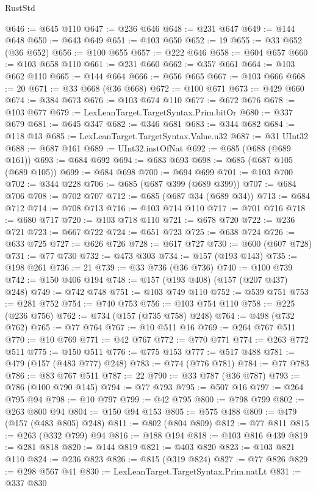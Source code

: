\begin{lexlean}{RustStd}
\begin{coremodule}
@646 := @645 @110
@647 := @236 @646
@648 := @231 @647
@649 := @144 @648
@650 := @643 @649
@651 := @103 @650
@652 := 19
@655 := @33 @652 (@36 @652)
@656 := @100 @655
@657 := @222 @646
@658 := @604 @657
@660 := @103 @658 @110
@661 := @231 @660
@662 := @357 @661
@664 := @103 @662 @110
@665 := @144 @664
@666 := @656 @665
@667 := @103 @666
@668 := 20
@671 := @33 @668 (@36 @668)
@672 := @100 @671
@673 := @429 @660
@674 := @384 @673
@676 := @103 @674 @110
@677 := @672 @676
@678 := @103 @677
@679 := LexLeanTarget.TargetSyntax.Prim.bitOr
@680 := @337 @679
@681 := @645 @347
@682 := @346 @681
@683 := @344 @682
@684 := @118 @13
@685 := LexLeanTarget.TargetSyntax.Value.u32
@687 := @31 UInt32
@688 := @687 @161
@689 := UInt32.instOfNat
@692 := @685 (@688 (@689 @161))
@693 := @684 @692
@694 := @683 @693
@698 := @685 (@687 @105 (@689 @105))
@699 := @684 @698
@700 := @694 @699
@701 := @103 @700
@702 := @344 @228
@706 := @685 (@687 @399 (@689 @399))
@707 := @684 @706
@708 := @702 @707
@712 := @685 (@687 @34 (@689 @34))
@713 := @684 @712
@714 := @708 @713
@716 := @103 @714 @110
@717 := @701 @716
@718 := @680 @717
@720 := @103 @718 @110
@721 := @678 @720
@722 := @236 @721
@723 := @667 @722
@724 := @651 @723
@725 := @638 @724
@726 := @633 @725
@727 := @626 @726
@728 := @617 @727
@730 := @600 (@607 @728)
@731 := @77 @730
@732 := @473 @303
@734 := @157 (@193 @143)
@735 := @198 @261
@736 := 21
@739 := @33 @736 (@36 @736)
@740 := @100 @739
@742 := @150 @406 @194
@748 := @157 (@193 @408) (@157 (@207 @437) @248)
@749 := @742 @748
@751 := @103 @749 @110
@752 := @539 @751
@753 := @281 @752
@754 := @740 @753
@756 := @103 @754 @110
@758 := @225 (@236 @756)
@762 := @734 (@157 (@735 @758) @248)
@764 := @498 (@732 @762)
@765 := @77 @764
@767 := @10 @511 @16
@769 := @264 @767 @511
@770 := @10 @769
@771 := @42 @767
@772 := @770 @771
@774 := @263 @772 @511
@775 := @150 @511
@776 := @775 @153
@777 := @517 @488
@781 := @479 (@157 (@483 @777) @248)
@783 := @774 (@776 @781)
@784 := @77 @783
@786 := @83 @767 @511
@787 := 22
@790 := @33 @787 (@36 @787)
@793 := @786 (@100 @790 @145)
@794 := @77 @793
@795 := @507 @16
@797 := @264 @795 @94
@798 := @10 @797
@799 := @42 @795
@800 := @798 @799
@802 := @263 @800 @94
@804 := @150 @94 @153
@805 := @575 @488
@809 := @479 (@157 (@483 @805) @248)
@811 := @802 (@804 @809)
@812 := @77 @811
@815 := @263 (@332 @799) @94
@816 := @188 @194
@818 := @103 @816 @439
@819 := @281 @818
@820 := @144 @819
@821 := @403 @820
@823 := @103 @821 @110
@824 := @236 @823
@826 := @815 (@319 @824)
@827 := @77 @826
@829 := @298 @567 @41
@830 := LexLeanTarget.TargetSyntax.Prim.natLt
@831 := @337 @830

\end{coremodule}
\end{lexlean}
